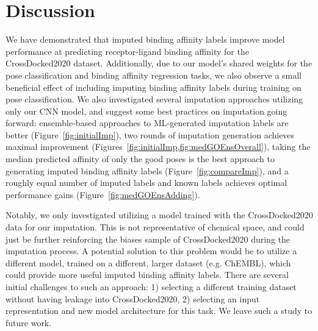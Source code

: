 \documentclass[journal=jcim,manuscript=article]{achemso}
\begin{document}
\section{Discussion}
We have demonstrated that imputed binding affinity labels improve model performance at predicting receptor-ligand binding affinity for the CrossDocked2020 dataset.
Additionally, due to our model's shared weights for the pose classification and binding affinity regression tasks, we also observe a small beneficial effect of including imputing binding affinity labels during training on pose classification.
We also investigated several imputation approaches utilizing only our CNN model, and suggest some best practices on imputation going forward: ensemble-based approaches to ML-generated imputation labels are better (Figure~\ref{fig:initialImp}), two rounds of imputation generation achieves maximal improvement (Figures~\ref{fig:initialImp,fig:medGOEnsOverall}), taking the median predicted affinity of only the good poses is the best approach to generating imputed binding affinity labels (Figure~\ref{fig:compareImp}), and a roughly equal number of imputed labels and known labels achieves optimal performance gains (Figure~\ref{fig:medGOEnsAdding}).

Notably, we only investigated utilizing a model trained with the CrossDocked2020 data for our imputation.
This is not representative of chemical space, and could just be further reinforcing the biases sample of CrossDocked2020 during the imputation process.
A potential solution to this problem would be to utilize a different model, trained on a different, larger dataset (e.g. ChEMBL\cite{Chembl}), which could provide more useful imputed binding affinity labels.
There are several initial challenges to such an approach: 1) selecting a different training dataset without having leakage into CrossDocked2020, 2) selecting an input representation and new model architecture for this task.
We leave such a study to future work.
\end{document}
